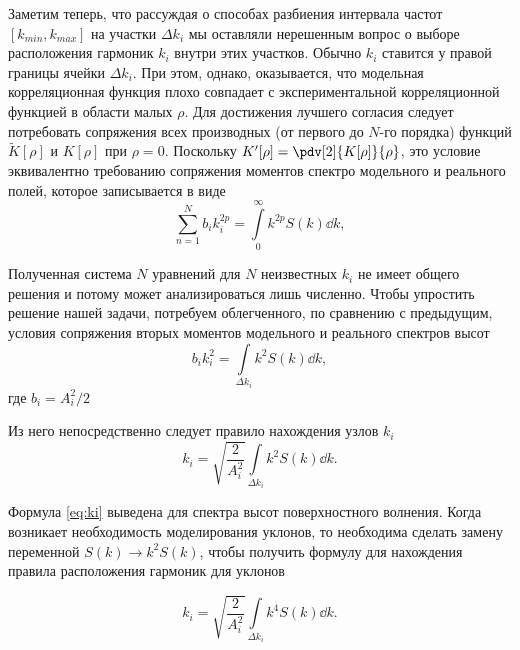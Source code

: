 \documentclass[a4paper,14pt]{extarticle}
\newcommand{\tK}{\widetilde K}
\begin{document}
Заметим теперь, что рассуждая о способах разбиения интервала частот $[k_{min},
k_{max}]$ на участки $\Delta k_i$ мы оставляли нерешенным вопрос о выборе
расположения гармоник $k_i$ внутри этих участков. Обычно  $k_i$ ставится у
правой границы ячейки  $\Delta k_i$. При этом, однако, оказывается, что
модельная корреляционная функция плохо совпадает с экспериментальной
корреляционной функцией в области малых  $\rho$. Для достижения лучшего
согласия следует потребовать сопряжения всех производных (от первого до $N$-го
порядка) функций $\tK[\rho]$ и  $K[\rho]$ при  $\rho=0$. 
Поскольку $K'[\rho] = \pdv[2]{K[\rho]}{\rho}$, это условие эквивалентно
требованию сопряжения моментов спектро модельного и реального полей, которое
записывается в виде
 \begin{equation}
    \label{eq:}
    \sum\limits_{n=1}^{N} b_i k_i^{2p} 
    = \int\limits_{0}^{\infty} k^{2p}S(k) \dd k, 
\end{equation}

Полученная система $N$ уравнений для $N$ неизвестных $k_i$ не имеет общего
решения и потому может анализироваться лишь численно. Чтобы упростить решение
нашей задачи, потребуем облегченного, по сравнению с предыдущим, условия
сопряжения вторых моментов модельного и реального спектров высот
 \begin{equation}
    \label{eq:}
    b_i k_i^2 = \int\limits_{\Delta k_i} k^2 S(k) \dd k,
\end{equation}
где $b_i= A_i^2 / 2$

Из него непосредственно следует правило нахождения узлов $k_i$ 
\begin{equation}
    \label{eq:ki}
    \boxed{
        k_i = \sqrt{\frac{2}{A_{i}^2}} \int\limits_{\Delta k_i} k^2 S(k) \dd k. 
    }
\end{equation}

Формула \eqref{eq:ki} выведена для спектра высот поверхностного волнения. Когда
возникает необходимость моделирования уклонов, то необходима сделать замену
переменной $S(k) \to k^2 S(k)$, чтобы получить формулу для нахождения правила
расположения гармоник для уклонов

\begin{equation}
    \label{eq:ki_slopes}
    \boxed{
        k_i = \sqrt{\frac{2}{A_{i}^2}} \int\limits_{\Delta k_i} k^4 S(k) \dd k. 
    }
\end{equation}
\end{document}
